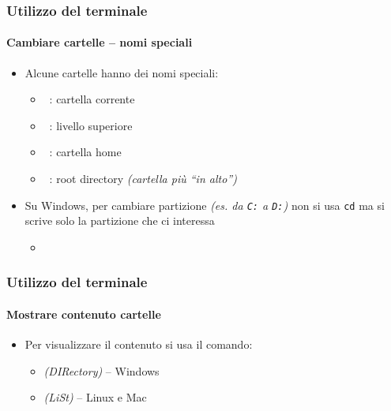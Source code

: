 \begin{exampleframe}
    \frametitle{Utilizzo del terminale}
    \framesubtitle{Cambiare cartelle -- nomi speciali}

    
    \begin{itemize}
        \item Alcune cartelle hanno dei nomi speciali:
        \begin{itemize}
            \item {}~: cartella corrente
            \item {}~: livello superiore
            \item {}~: cartella home
            \item {}~: root directory \textit{(cartella più ``in alto'')}
        \end{itemize}
        \bigskip

        \item Su Windows, per cambiare partizione \textit{(es. da \texttt{C:} a \texttt{D:})} non si usa \texttt{cd} ma si scrive solo la partizione che ci interessa
        \begin{itemize}
            \item {}
        \end{itemize}
    \end{itemize}
\end{exampleframe}

\begin{contentframe}
    \frametitle{Utilizzo del terminale}
    \framesubtitle{Mostrare contenuto cartelle}

    \begin{itemize}
        \item Per visualizzare il contenuto si usa il comando:
        \begin{itemize}
            \item {} \textit{(DIRectory)} -- Windows
            \item {} \textit{(LiSt)} -- Linux e Mac
        \end{itemize}
    \end{itemize}
\end{contentframe}

